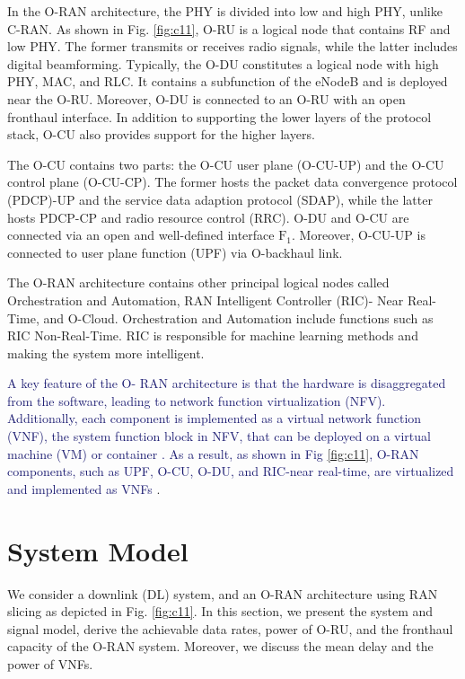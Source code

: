 \documentclass[lettersize,journal]{IEEEtran}
\begin{document}
In the O-RAN architecture, the PHY is divided into low and high PHY, unlike C-RAN. As shown in Fig. \ref{fig:c11}, O-RU is a logical node that contains RF and low PHY. The former transmits or receives radio signals, while the latter includes digital beamforming. Typically, the O-DU constitutes a logical node with high PHY, MAC, and RLC. It contains a subfunction of the eNodeB and is deployed near the O-RU.
Moreover, O-DU is connected to an O-RU with an open fronthaul interface.
In addition to supporting the lower layers of the protocol stack, O-CU also provides support for the higher layers.

The O-CU contains two parts: the O-CU user plane (O-CU-UP) and the O-CU control plane (O-CU-CP). The former hosts the packet data convergence protocol (PDCP)-UP and the service data adaption protocol (SDAP), while the latter hosts PDCP-CP and radio resource control (RRC).
O-DU and O-CU are connected via an open and well-defined interface $\text{F}_1$.
Moreover, O-CU-UP is connected to user plane function (UPF) via O-backhaul link.

The O-RAN architecture contains other principal logical nodes called Orchestration and Automation, RAN Intelligent Controller (RIC)- Near Real-Time, and O-Cloud. Orchestration and Automation include functions such as RIC Non-Real-Time. RIC is responsible for machine learning methods and making the system more intelligent.

\textcolor{MidnightBlue}{A key feature of the O-
RAN architecture is that the hardware is disaggregated from
the software, leading to network function virtualization
(NFV).  Additionally, each component is implemented as a virtual network function (VNF), the system function block in NFV, that can be deployed on a virtual machine (VM) or container \cite{mijumbi2015network}. As a result, as shown in Fig \ref{fig:c11}, O-RAN components, such as UPF, O-CU, O-DU, and RIC-near real-time, are virtualized and implemented as VNFs}
\cite{gavrilovska2020cloud,niknam2020intelligent,kazemifard2021minimum,both2021system,ORANArch,ORANML,lin2021toward}. 
\vspace*{-.75em}
\section{System Model}\label{systemmodel}
We consider a downlink (DL) system, and an O-RAN architecture using RAN slicing as depicted in Fig. \ref{fig:c11}.
In this section, we present the system and signal model, derive the achievable data rates, power of O-RU, and the fronthaul capacity  of the O-RAN system. Moreover, we discuss the mean delay and the power of VNFs.
\end{document}
